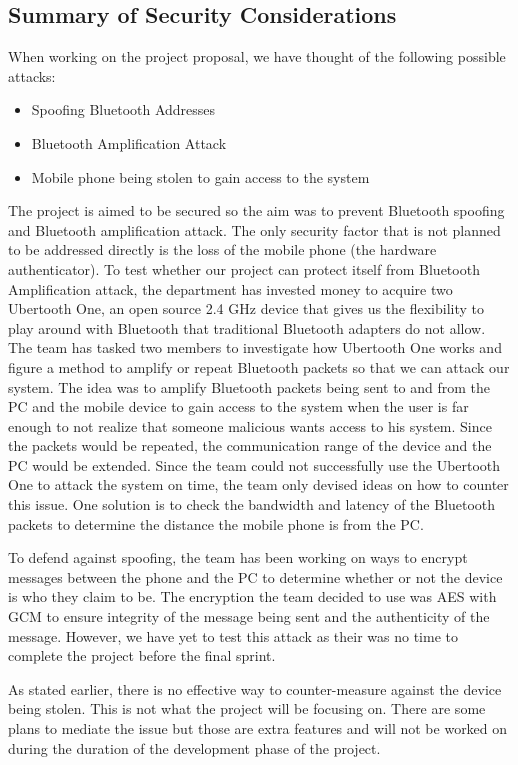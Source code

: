 \documentclass[letterpaper,twocolumn,10pt]{article}
\begin{document}
\subsection{Summary of Security Considerations}
When working on the project proposal, we have thought of the following possible attacks:
\begin{itemize}[noitemsep]
\item Spoofing Bluetooth Addresses
\item Bluetooth Amplification Attack
\item Mobile phone being stolen to gain access to the system
\end{itemize}
The project is aimed to be secured so the aim was to prevent Bluetooth spoofing and Bluetooth amplification attack. The only security factor that is not planned to be addressed directly is the loss of the mobile phone (the hardware authenticator). To test whether our project can protect itself from Bluetooth Amplification attack, the department has invested money to acquire two Ubertooth One, an open source 2.4 GHz device that gives us the flexibility to play around with Bluetooth that traditional Bluetooth adapters do not allow. The team has tasked two members to investigate how Ubertooth One works and figure a method to amplify or repeat Bluetooth packets so that we can attack our system. The idea was to amplify Bluetooth packets being sent to and from the PC and the mobile device to gain access to the system when the user is far enough to not realize that someone malicious wants access to his system. Since the packets would be repeated, the communication range of the device and the PC would be extended. Since the team could not successfully use the Ubertooth One to attack the system on time, the team only devised ideas on how to counter this issue. One solution is to check the bandwidth and latency of the Bluetooth packets to determine the distance the mobile phone is from the PC.

To defend against spoofing, the team has been working on ways to encrypt messages between the phone and the PC to determine whether or not the device is who they claim to be. The encryption the team decided to use was AES with GCM to ensure integrity of the message being sent and the authenticity of the message. However, we have yet to test this attack as their was no time to complete the project before the final sprint.

As stated earlier, there is no effective way to counter-measure against the device being stolen. This is not what the project will be focusing on. There are some plans to mediate the issue but those are extra features and will not be worked on during the duration of the development phase of the project.
\end{document}
